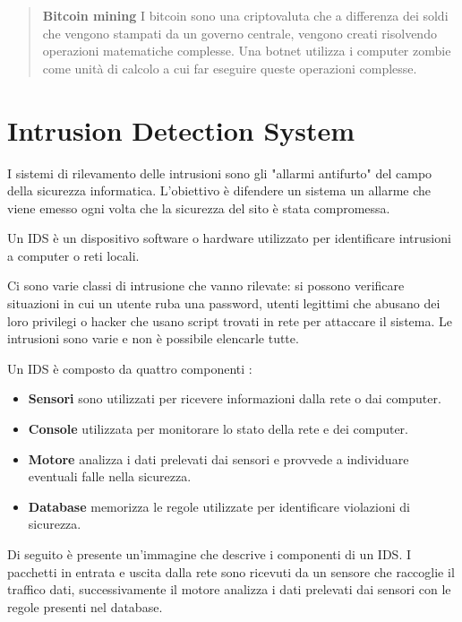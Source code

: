 \documentclass[../main.tex]{subfiles}
\begin{document}
\begin{verse}
				\textbf{Bitcoin mining} I bitcoin sono una criptovaluta che a differenza dei soldi che vengono stampati da un governo centrale, vengono creati risolvendo operazioni matematiche complesse. Una botnet utilizza i computer zombie come unità di calcolo a cui far eseguire queste operazioni complesse.
\end{verse}

\section{Intrusion Detection System}
I sistemi di rilevamento delle intrusioni sono gli "allarmi antifurto" del campo della sicurezza informatica. L'obiettivo è difendere un sistema un allarme che viene emesso ogni volta che la sicurezza del sito è stata compromessa. \cite{IDS} \newline

Un IDS è un dispositivo software o hardware utilizzato per identificare intrusioni a computer o reti locali.

Ci sono varie classi di intrusione che vanno rilevate: si possono verificare situazioni in cui un utente ruba una password, utenti legittimi che abusano dei loro privilegi o hacker che usano script trovati in rete per attaccare il sistema. Le intrusioni sono varie e non è possibile elencarle tutte.

Un IDS è composto da quattro componenti \cite{idsbook}:

\begin{itemize}
				\item \textbf{Sensori} sono utilizzati per ricevere informazioni dalla rete o dai computer.

				\item \textbf{Console} utilizzata per monitorare lo stato della rete e dei computer.

				\item \textbf{Motore} analizza i dati prelevati dai sensori e provvede a individuare eventuali falle nella sicurezza.

				\item \textbf{Database} memorizza le regole utilizzate per identificare violazioni di sicurezza.
\end{itemize}

Di seguito è presente un'immagine che descrive i componenti di un IDS. I pacchetti in entrata e uscita dalla rete sono ricevuti da un sensore che raccoglie il traffico dati, successivamente il motore analizza i dati prelevati dai sensori con le regole presenti nel database.
\end{document}
